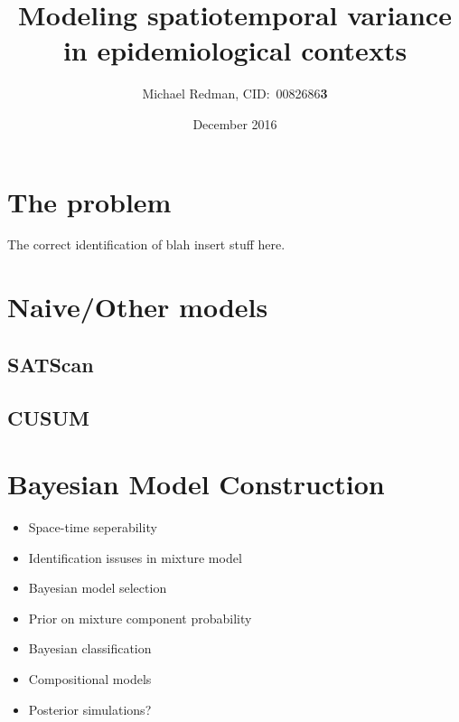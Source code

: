 \documentclass{article}
\begin{document}
\title{Modeling spatiotemporal variance in epidemiological contexts}
\author{Michael Redman, CID:\ 0082686\textbf{3}}
\date{December 2016}

\maketitle

\section{The problem}

The correct identification of blah insert stuff here.

\section{Naive/Other models}

\subsection{SATScan}

\subsection{CUSUM}

\section{Bayesian Model Construction}

\begin{itemize}

\item Space-time seperability

\item Identification issuses in mixture model

\item Bayesian model selection

\item Prior on mixture component probability

\item Bayesian classification

\item Compositional models

\item Posterior simulations?

\end{itemize}
\end{document}

